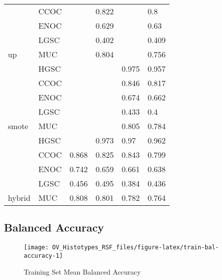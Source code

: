 \documentclass[
]{report}
\begin{document}
\begin{table}
\begin{tabular}[t]{l|l|l|l|l|l}
\cline{2-6}
 & CCOC & \cellcolor[HTML]{FFD700}{0.869} & 0.822 & \cellcolor[HTML]{FFD700}{0.87} & 0.8\\
\cline{2-6}
 & ENOC & \cellcolor[HTML]{FFD700}{0.734} & 0.629 & \cellcolor[HTML]{FFD700}{0.728} & 0.63\\
\cline{2-6}
 & LGSC & \cellcolor[HTML]{FFD700}{0.236} & 0.402 & \cellcolor[HTML]{FFD700}{0.394} & 0.409\\
\cline{2-6}
\multirow{-5}{*}{\raggedright\arraybackslash up} & MUC & \cellcolor[HTML]{FFD700}{0.835} & 0.804 & \cellcolor[HTML]{FFD700}{0.814} & 0.756\\
\cline{1-6}
 & HGSC & \cellcolor[HTML]{FFD700}{0.974} & \cellcolor[HTML]{FFD700}{0.973} & 0.975 & 0.957\\
\cline{2-6}
 & CCOC & \cellcolor[HTML]{FFD700}{0.833} & \cellcolor[HTML]{FFD700}{0.782} & 0.846 & 0.817\\
\cline{2-6}
 & ENOC & \cellcolor[HTML]{FFD700}{0.701} & \cellcolor[HTML]{FFD700}{0.588} & 0.674 & 0.662\\
\cline{2-6}
 & LGSC & \cellcolor[HTML]{FFD700}{0.285} & \cellcolor[HTML]{FFD700}{0.519} & 0.433 & 0.4\\
\cline{2-6}
\multirow{-5}{*}{\raggedright\arraybackslash smote} & MUC & \cellcolor[HTML]{FFD700}{0.827} & \cellcolor[HTML]{FFD700}{0.825} & 0.805 & 0.784\\
\cline{1-6}
 & HGSC & \cellcolor[HTML]{90ee90}{0.977} & 0.973 & 0.97 & 0.962\\
\cline{2-6}
 & CCOC & 0.868 & 0.825 & 0.843 & 0.799\\
\cline{2-6}
 & ENOC & 0.742 & 0.659 & 0.661 & 0.638\\
\cline{2-6}
 & LGSC & 0.456 & 0.495 & 0.384 & 0.436\\
\cline{2-6}
\multirow{-5}{*}{\raggedright\arraybackslash hybrid} & MUC & 0.808 & 0.801 & 0.782 & 0.764\\
\hline
\end{tabular}
\end{table}

\hypertarget{balanced-accuracy}{%
\subsection{Balanced Accuracy}\label{balanced-accuracy}}

\begin{figure}[H]

{\centering \texttt{[image: OV\_Histotypes\_RSF\_files/figure-latex/train-bal-accuracy-1]} 

}

\caption{Training Set Mean Balanced Accuracy}\label{fig:train-bal-accuracy}
\end{figure}
\end{document}

